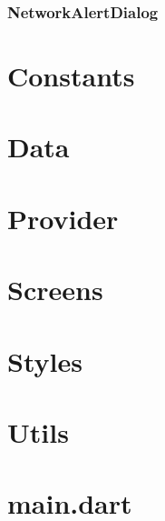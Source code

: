 \subsubsection*{NetworkAlertDialog}
\label{subsubsec:network-alert-dialog}
\section{Constants}
\label{sec:constants}

\section{Data}
\label{sec:data}

\section{Provider}
\label{sec:provider}

\section{Screens}
\label{sec:screens}

\section{Styles}
\label{sec:styles}

\section{Utils}
\label{sec:utils}

\section{main.dart}
\label{sec:main}




